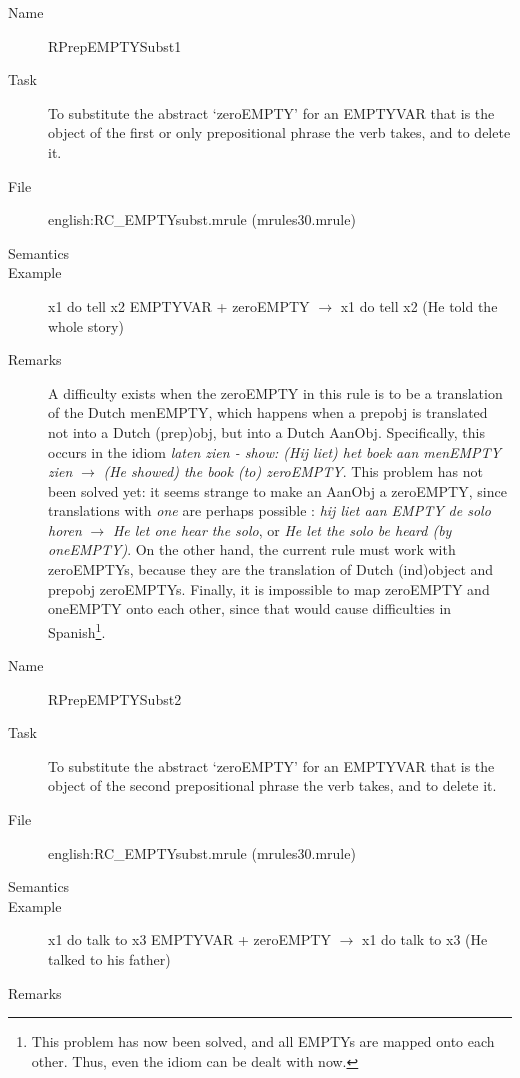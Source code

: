 \begin{description}
\vspace{1 cm}
\begin{description}
\item[Name] RPrepEMPTYSubst1
\item[Task] To substitute the abstract `zeroEMPTY' for an EMPTYVAR that is the 
object of the first or only prepositional phrase the verb takes, and to delete 
it.
\item[File] english:RC\_EMPTYsubst.mrule (mrules30.mrule)
\item[Semantics]
\item[Example] x1 do tell x2 EMPTYVAR + zeroEMPTY $\rightarrow$ x1 do tell x2
(He told the whole story)
\item[Remarks] A difficulty exists when the zeroEMPTY in this rule is to be a 
translation of the Dutch menEMPTY, which happens when a prepobj is translated 
not into a Dutch (prep)obj, but into a Dutch AanObj. Specifically, this occurs 
in the idiom {\em laten zien - show: (Hij liet) het boek aan menEMPTY zien\/} $
\rightarrow$ {\em (He showed) the book (to) zeroEMPTY\/}.
This problem has not been solved yet: it seems strange to make an AanObj a 
zeroEMPTY, since translations with {\em one\/} are perhaps possible : 
{\em hij liet aan EMPTY de solo horen\/} $\rightarrow$ {\em He 
let one hear the solo\/}, or {\em He let the solo be heard (by oneEMPTY)\/}. On 
the other hand, the current rule must work with zeroEMPTYs, because they are 
the translation of Dutch (ind)object and prepobj zeroEMPTYs. Finally,
it is impossible to map zeroEMPTY and oneEMPTY onto each other, 
since that would cause difficulties in Spanish\footnote{This problem has now 
been solved, and all EMPTYs are mapped onto each other. Thus, even the idiom 
can be dealt with now.}.
\end{description}

\vspace{1 cm}
\begin{description}
\item[Name]   RPrepEMPTYSubst2
\item[Task] To substitute the abstract `zeroEMPTY' for an EMPTYVAR that is the 
object of the second prepositional phrase the verb takes, and to delete it.
\item[File] english:RC\_EMPTYsubst.mrule (mrules30.mrule)
\item[Semantics]
\item[Example] x1 do talk to x3 EMPTYVAR + zeroEMPTY $\rightarrow$ x1 do talk to 
x3 (He talked to his father)
\item[Remarks] 
\end{description}


\end{description}

